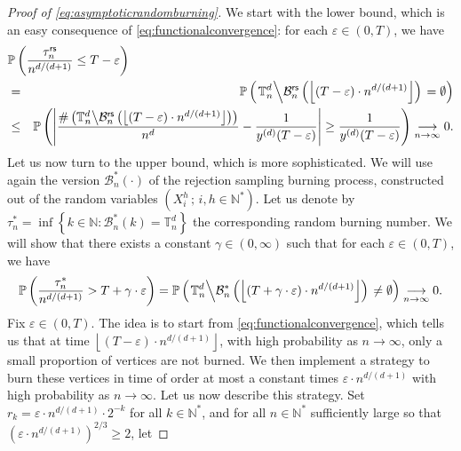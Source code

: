 \documentclass[a4paper,11pt]{article}
\begin{document}
\begin{proof}[Proof of \eqref{eq:asymptoticrandomburning}]
We start with the lower bound, which is an easy consequence of \eqref{eq:functionalconvergence}: for each $\varepsilon\in(0,T)$, we have
\begin{eqnarray*}
\lefteqn{\mathbb{P}\left(\frac{\tau_n^\mathsf{rs}}{n^{d/(d+1)}}\leq T-\varepsilon\right)}\\
&=&\mathbb{P}\left(\left.\mathbb{T}_n^d\middle\backslash\mathcal{B}_n^\mathsf{rs}\left(\left\lfloor(T-\varepsilon)\cdot n^{d/(d+1)}\right\rfloor\right)\right.=\emptyset\right)\\
&\leq&\mathbb{P}\left(\left|\frac{\#\left(\mathbb{T}_n^d\middle\backslash\mathcal{B}_n^\mathsf{rs}\left(\left\lfloor(T-\varepsilon)\cdot n^{d/(d+1)}\right\rfloor\right)\right)}{n^d}-\frac{1}{y^{(d)}(T-\varepsilon)}\right|\geq\frac{1}{y^{(d)}(T-\varepsilon)}\right)\underset{n\to\infty}{\longrightarrow}0.
\end{eqnarray*}
Let us now turn to the upper bound, which is more sophisticated.
We will use again the version $\mathcal{B}_n^*(\cdot)$ of the rejection sampling burning process, constructed out of the random variables $\left(X_i^h\,;\,i,h\in\mathbb{N}^*\right)$.
Let us denote by $\tau_n^*=\inf\left\{k\in\mathbb{N}:\mathcal{B}_n^*(k)=\mathbb{T}_n^d\right\}$ the corresponding random burning number.
We will show that there exists a constant $\gamma\in(0,\infty)$ such that for each $\varepsilon\in(0,T)$, we have
\begin{equation}\label{eq:asymptoticgoal}
\mathbb{P}\left(\frac{\tau_n^*}{n^{d/(d+1)}}>T+\gamma\cdot\varepsilon\right)=\mathbb{P}\left(\left.\mathbb{T}_n^d\middle\backslash\mathcal{B}_n^*\left(\left\lfloor(T+\gamma\cdot\varepsilon)\cdot n^{d/(d+1)}\right\rfloor\right)\right.\neq\emptyset\right)\underset{n\to\infty}{\longrightarrow}0.
\end{equation}
Fix $\varepsilon\in(0,T)$.
The idea is to start from \eqref{eq:functionalconvergence}, which tells us that at time $\left\lfloor(T-\varepsilon)\cdot n^{d/(d+1)}\right\rfloor$, with high probability as $n\to\infty$, only a small proportion of vertices are not burned.
We then implement a strategy to burn these vertices in time of order at most a constant times $\varepsilon\cdot n^{d/(d+1)}$ with high probability as $n\to\infty$.
Let us now describe this strategy.
Set ${r_k=\varepsilon\cdot n^{d/(d+1)}\cdot2^{-k}}$ for all ${k\in\mathbb{N}^*}$, and for all $n\in\mathbb{N}^*$ sufficiently large so that ${\left(\varepsilon\cdot n^{d/(d+1)}\right)^{2/3}\geq2}$, let

\end{proof}
\end{document}
